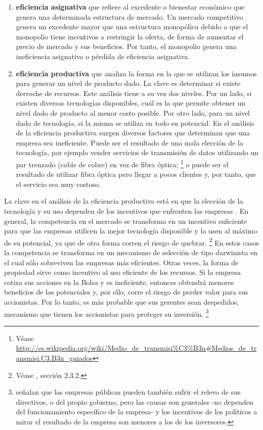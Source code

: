 \documentclass[
  12pt,
  spanish,
]{book}
\begin{document}
\begin{enumerate}
\def\labelenumi{\arabic{enumi}.}
\item
  \textbf{eficiencia asignativa} que refiere al excedente o bienestar
  económico que genera una determinada estructura de mercado. Un mercado
  competitivo genera un excedente mayor que una estructura monopólica
  debido a que el monopolio tiene incentivos a restringir la oferta, de
  forma de aumentar el precio de mercado y sus beneficios. Por tanto, el
  monopolio genera una ineficiencia asignativa o pérdida de eficiencia
  asignativa.
\item
  \textbf{eficiencia productiva} que analiza la forma en la que se
  utilizan los insumos para generar un nivel de producto dado. La clave
  es determinar si existe derroche de recursos. Este análisis tiene a su
  vez dos niveles. Por un lado, si existen diversas tecnologías
  disponibles, cuál es la que permite obtener un nivel dado de producto
  al menor costo posible. Por otro lado, para un nivel dado de
  tecnología, si la misma se utiliza en todo su potencial. En el
  análisis de la eficiencia productiva surgen diversos factores que
  determinan que una empresa sea ineficiente. Puede ser el resultado de
  una mala elección de la tecnología, por ejemplo vender servicios de
  transmisión de datos utilizando un par trenzado (cable de cobre) en
  vez de fibra óptica; \footnote{Véase
    \url{http://es.wikipedia.org/wiki/Medio_de_transmisi\%C3\%B3n\#Medios_de_transmisi.C3.B3n_guiados}}
  o puede ser el resultado de utilizar fibra óptica pero llegar a pocos
  clientes y, por tanto, que el servicio sea muy costoso.
\end{enumerate}

La clave en el análisis de la eficiencia productiva está en que la
elección de la tecnología y su uso dependen de los incentivos que
enfrenten las empresas \citep{Nickell1997}. En general, la competencia
en el mercado se transforma en un incentivo suficiente para que las
empresas utilicen la mejor tecnología disponible y la usen al máximo de
su potencial, ya que de otra forma corren el riesgo de quebrar.
\footnote{Véase \citet{Motta2004}, sección 2.3.2.} En estos casos la
competencia se transforma en un mecanismo de selección de tipo
darwinista en el cual sólo sobreviven las empresas más eficientes. Otras
veces, la forma de propiedad sirve como incentivo al uso eficiente de
los recursos. Si la empresa cotiza sus acciones en la Bolsa y es
ineficiente, entonces obtendrá menores beneficios de los potenciales y,
por ello, corre el riesgo de perder valor para sus accionistas. Por lo
tanto, es más probable que sus gerentes sean despedidos, mecanismo que
tienen los accionistas para proteger su inversión. \footnote{\citet{Laffont1993}
  señalan que las empresas públicas pueden también sufrir el relevo de
  sus directivos, o del propio gobierno, pero las causas son generales
  -no dependen del funcionamiento específico de la empresa- y los
  incentivos de los políticos a mirar el resultado de la empresa son
  menores a los de los inversores.}
\end{document}
